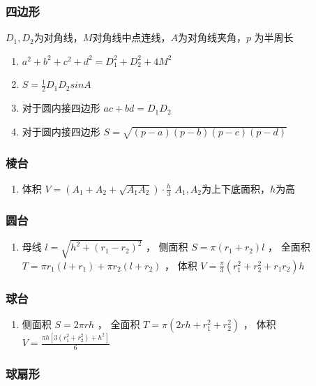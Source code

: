 \documentclass[landscape,a4paper]{article}
\begin{document}
\begin{spacing}{0.3}
\begin{multicols}{2}
\subsubsection{四边形}

$D_1, D_2$为对角线，$M$对角线中点连线，$A$为对角线夹角，$p$ 为半周长
\begin{enumerate}
	\item $a^2+b^2+c^2+d^2=D_1^2+D_2^2+4M^2$
	\item $S=\frac{1}{2}D_1D_2sinA$
	\item 对于圆内接四边形
		$ac+bd=D_1D_2$
	\item 对于圆内接四边形
		$S=\sqrt{(p-a)(p-b)(p-c)(p-d)}$
\end{enumerate}

\subsubsection{棱台}

\begin{enumerate}
	\item 体积
		$V=(A_1+A_2+\sqrt{A_1A_2}) \cdot \frac{h}{3}$
		$A_1,A_2$为上下底面积，$h$为高
\end{enumerate}

\subsubsection{圆台}

\begin{enumerate}
	\item 母线
		$l=\sqrt{h^2+(r_1-r_2)^2}$
	，  侧面积
		$S=\pi(r_1+r_2)l$
	，  全面积
		$T=\pi r_1(l+r_1)+\pi r_2(l+r_2)$
	，  体积
		$V=\frac{\pi}{3}(r_1^2+r_2^2+r_1r_2)h$
\end{enumerate}

\subsubsection{球台}

\begin{enumerate}
	\item 侧面积
		$S=2\pi rh$
	，    全面积
		$T=\pi(2rh+r_1^2+r_2^2)$
	，    体积
		$V=\frac{\pi h[3(r_1^2+r_2^2)+h^2]}{6}$
\end{enumerate}

\subsubsection{球扇形}


\end{multicols}
\end{spacing}
\end{document}
